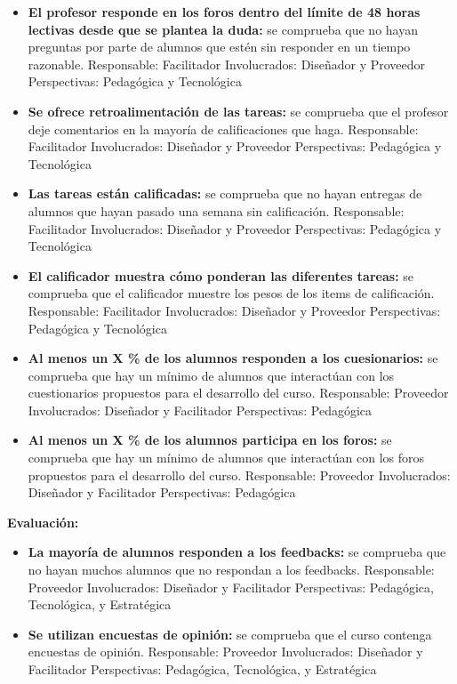\begin{itemize}
	\item
	\textbf{El profesor responde en los foros dentro del límite de 48
		horas lectivas desde que se plantea la duda:} se comprueba que no
	hayan preguntas por parte de alumnos que estén sin responder en un
	tiempo razonable. {Responsable:} Facilitador
	{Involucrados:} Diseñador y Proveedor {Perspectivas:}
	Pedagógica y Tecnológica
	\item
	\textbf{Se ofrece retroalimentación de las tareas:} se comprueba que
	el profesor deje comentarios en la mayoría de calificaciones que haga.
	{Responsable:} Facilitador {Involucrados:} Diseñador y
	Proveedor {Perspectivas:} Pedagógica y Tecnológica
	\item
	\textbf{Las tareas están calificadas:} se comprueba que no hayan
	entregas de alumnos que hayan pasado una semana sin calificación.
	{Responsable:} Facilitador {Involucrados:} Diseñador y
	Proveedor {Perspectivas:} Pedagógica y Tecnológica
	\item
	\textbf{El calificador muestra cómo ponderan las diferentes tareas:}
	se comprueba que el calificador muestre los pesos de los items de
	calificación. {Responsable:} Facilitador {Involucrados:}
	Diseñador y Proveedor {Perspectivas:} Pedagógica y Tecnológica
	\item
	\textbf{Al menos un X \% de los alumnos responden a los cuesionarios:}
	se comprueba que hay un mínimo de alumnos que interactúan con los cuestionarios propuestos para el desarrollo del curso. {Responsable:} Proveedor {Involucrados:}
	Diseñador y Facilitador {Perspectivas:} Pedagógica
	\item
	\textbf{Al menos un X \% de los alumnos participa en los foros:}
	se comprueba que hay un mínimo de alumnos que interactúan con los foros propuestos para el desarrollo del curso. {Responsable:} Proveedor {Involucrados:}
	Diseñador y Facilitador {Perspectivas:} Pedagógica
\end{itemize}

\textbf{Evaluación:}

\begin{itemize}
	\item
	\textbf{La mayoría de alumnos responden a los feedbacks:} se comprueba
	que no hayan muchos alumnos que no respondan a los feedbacks.
	{Responsable:} Proveedor {Involucrados:} Diseñador y
	Facilitador {Perspectivas:} Pedagógica, Tecnológica, y
	Estratégica
	\item
	\textbf{Se utilizan encuestas de opinión:} se comprueba que el curso
	contenga encuestas de opinión. {Responsable:} Proveedor
	{Involucrados:} Diseñador y Facilitador {Perspectivas:}
	Pedagógica, Tecnológica, y Estratégica
\end{itemize}

